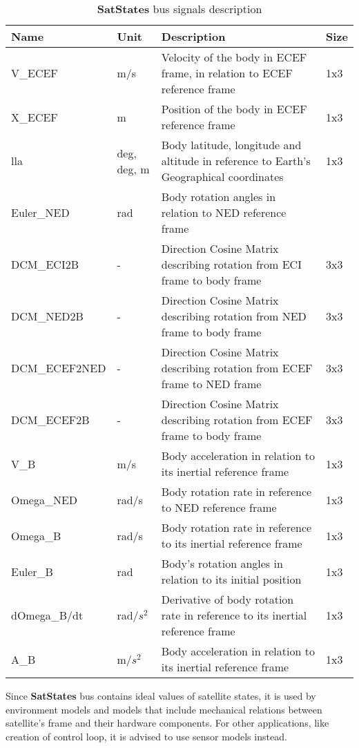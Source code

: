         \begin{table}[H]
            \begin{tabularx}{\textwidth}{llXl}
            \textbf{Name} & \textbf{Unit} & \textbf{Description} & \textbf{Size} \\[0.1cm]\hline\rule{0pt}{1.2\normalbaselineskip}
            V\_ECEF & m/s & Velocity of the body in ECEF frame, in relation to ECEF reference frame & 1x3 \\
            X\_ECEF & m & Position of the body in ECEF reference frame & 1x3 \\
            lla & deg, deg, m & Body latitude, longitude and altitude in reference to Earth's Geographical coordinates & 1x3 \\
            Euler\_NED & rad & Body rotation angles in relation to NED reference frame &  \\
            DCM\_ECI2B & - & Direction Cosine Matrix describing rotation from ECI frame to body frame & 3x3 \\
            DCM\_NED2B & - &  Direction Cosine Matrix describing rotation from NED frame to body frame & 3x3  \\
            DCM\_ECEF2NED & - & Direction Cosine Matrix describing rotation from ECEF frame to NED frame & 3x3  \\
            DCM\_ECEF2B & - &  Direction Cosine Matrix describing rotation from ECEF frame to body frame & 3x3  \\
            V\_B & m/s & Body acceleration in relation to its inertial reference frame &  1x3 \\
            Omega\_NED & rad/s & Body rotation rate in reference to NED reference frame & 1x3  \\
            Omega\_B & rad/s & Body rotation rate in reference to its inertial reference frame  & 1x3 \\
            Euler\_B & rad & Body's rotation angles in relation to its initial position  & 1x3 \\
            dOmega\_B/dt & rad/$s^2$ & Derivative of body rotation rate in reference to its inertial reference frame & 1x3 \\
            A\_B & m/$s^2$ & Body acceleration in relation to its inertial reference frame & 1x3
            \end{tabularx}
            \caption{\textbf{SatStates} bus signals description}
        \end{table}

        Since \textbf{SatStates} bus contains ideal values of satellite states, it is used by environment models and models that include mechanical relations between satellite's frame and their hardware components. For other applications, like creation of control loop, it is advised to use sensor models instead.

